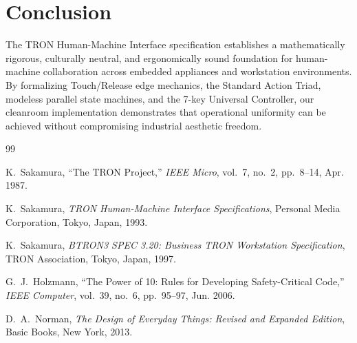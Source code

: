 \documentclass[10pt,journal,compsoc,twocolumn]{article}
\begin{document}
\section{Conclusion}
\label{sec:conclusion}

The TRON Human-Machine Interface specification establishes a mathematically rigorous, culturally neutral, and ergonomically sound foundation for human-machine collaboration across embedded appliances and workstation environments. By formalizing Touch/Release edge mechanics, the Standard Action Triad, modeless parallel state machines, and the 7-key Universal Controller, our cleanroom implementation demonstrates that operational uniformity can be achieved without compromising industrial aesthetic freedom.

\begin{thebibliography}{99}

K.~Sakamura, ``The TRON Project,'' \emph{IEEE Micro}, vol.~7, no.~2, pp.~8--14, Apr. 1987.

K.~Sakamura, \emph{TRON Human-Machine Interface Specifications}, Personal Media Corporation, Tokyo, Japan, 1993.

K.~Sakamura, \emph{BTRON3 SPEC 3.20: Business TRON Workstation Specification}, TRON Association, Tokyo, Japan, 1997.

G.~J.~Holzmann, ``The Power of 10: Rules for Developing Safety-Critical Code,'' \emph{IEEE Computer}, vol.~39, no.~6, pp.~95--97, Jun. 2006.

D.~A.~Norman, \emph{The Design of Everyday Things: Revised and Expanded Edition}, Basic Books, New York, 2013.

\end{thebibliography}
\end{document}
